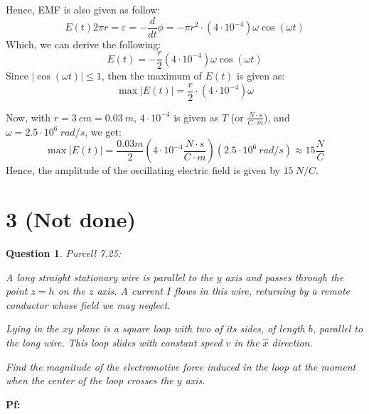 \documentclass{article}
\newtheorem{question}{Question}
\begin{document}
Hence, EMF is also given as follow:
$$E(t)2\pi r=\varepsilon=-\frac{d}{dt}\phi = -\pi r^2\cdot (4\cdot 10^{-4})\omega \cos(\omega t)$$
Which, we can derive the following:
$$E(t)=-\frac{r}{2}(4\cdot 10^{-4})\omega \cos(\omega t)$$
Since $|\cos(\omega t)|\leq 1$, then the maximum of $E(t)$ is given as:
$$\max|E(t)|=\frac{r}{2}\cdot (4\cdot 10^{-4})\omega$$

\hfill

Now, with $r=3\ cm=0.03\ m$, $4\cdot 10^{-4}$ is given as $T$ (or $\frac{N\cdot s}{C\cdot m}$), and $\omega = 2.5\cdot 10^6\ rad/s$, we get:
$$\max|E(t)|=\frac{0.03 m}{2}\left(4\cdot 10^{-4} \frac{N\cdot s}{C\cdot m}\right)(2.5\cdot 10^6\ rad/s)\approx 15 \frac{N}{C}$$
Hence, the amplitude of the oscillating electric field is given by $15\ N/C$.

\break

\section*{3 (Not done)}
\begin{myBox}[]{}
    \begin{question}
        Purcell 7.25:

        A long straight stationary wire is parallel to the $y$ axis and passes
        through the point $z = h$ on the $z$ axis. A current $I$ flows in this
        wire, returning by a remote conductor whose field we may neglect.

        Lying in the $xy$ plane is a square loop with two of its sides, of
        length $b$, parallel to the long wire. This loop slides with constant
        speed $v$ in the $\hat{x}$ direction. 
        
        Find the magnitude of the electromotive
        force induced in the loop at the moment when the center of the
        loop crosses the $y$ axis.
    \end{question}
\end{myBox}

\textbf{Pf:}



\break
\end{document}
